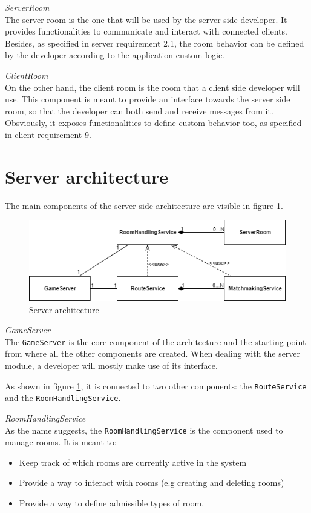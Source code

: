 \bigskip
\textit{ServerRoom}
\\
The server room is the one that will be used by the server side developer. It provides functionalities to communicate and interact with connected clients. Besides, as specified in server requirement 2.1, the room behavior can be defined by the developer according to the application custom logic.

\bigskip
\textit{ClientRoom}
\\
On the other hand, the client room is the room that a client side developer will use. This component is meant to provide an interface towards the server side room, so that the developer can both send and receive messages from it. Obsviously, it exposes functionalities to define custom behavior too, as specified in client requirement 9.

\section{Server architecture} \label{sec:server_arch}
The main components of the server side architecture are visible in figure \ref{fig:server_classes}. 

\begin{figure}[H]
	\centering
	\includegraphics[scale=0.7]{images/3-architecture/server-architecture.png}
	\caption{Server architecture}
	\label{fig:server_classes}
\end{figure}

\bigskip
\textit{GameServer}
\\
The \texttt{GameServer} is the core component of the architecture and the starting point from where all the other components are created.
When dealing with the server module, a developer will mostly make use of its interface.

As shown in figure \ref{fig:server_classes}, it is connected to two other components: the \texttt{RouteService} and the \texttt{RoomHandlingService}.

\bigskip
\textit{RoomHandlingService}
\\
As the name suggests, the \texttt{RoomHandlingService} is the component used to manage rooms. It is meant to:
\begin{itemize}
	\item Keep track of which rooms are currently active in the system
	\item Provide a way to interact with rooms (e.g creating and deleting rooms)
	\item Provide a way to define admissible types of room.
\end{itemize}


